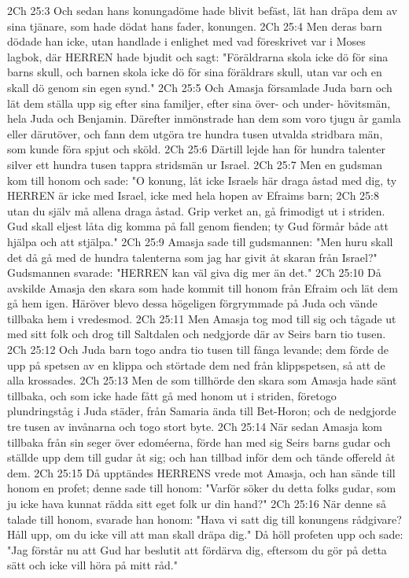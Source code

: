 2Ch 25:3  Och sedan hans konungadöme hade blivit befäst, lät han dräpa dem av sina tjänare, som hade dödat hans fader, konungen.
2Ch 25:4  Men deras barn dödade han icke, utan handlade i enlighet med vad föreskrivet var i Moses lagbok, där HERREN hade bjudit och sagt: "Föräldrarna skola icke dö för sina barns skull, och barnen skola icke dö för sina föräldrars skull, utan var och en skall dö genom sin egen synd."
2Ch 25:5  Och Amasja församlade Juda barn och lät dem ställa upp sig efter sina familjer, efter sina över- och under- hövitsmän, hela Juda och Benjamin. Därefter inmönstrade han dem som voro tjugu år gamla eller därutöver, och fann dem utgöra tre hundra tusen utvalda stridbara män, som kunde föra spjut och sköld.
2Ch 25:6  Därtill lejde han för hundra talenter silver ett hundra tusen tappra stridsmän ur Israel.
2Ch 25:7  Men en gudsman kom till honom och sade: "O konung, låt icke Israels här draga åstad med dig, ty HERREN är icke med Israel, icke med hela hopen av Efraims barn;
2Ch 25:8  utan du själv må allena draga åstad. Grip verket an, gå frimodigt ut i striden. Gud skall eljest låta dig komma på fall genom fienden; ty Gud förmår både att hjälpa och att stjälpa."
2Ch 25:9  Amasja sade till gudsmannen: "Men huru skall det då gå med de hundra talenterna som jag har givit åt skaran från Israel?" Gudsmannen svarade: "HERREN kan väl giva dig mer än det."
2Ch 25:10  Då avskilde Amasja den skara som hade kommit till honom från Efraim och lät dem gå hem igen. Häröver blevo dessa högeligen förgrymmade på Juda och vände tillbaka hem i vredesmod.
2Ch 25:11  Men Amasja tog mod till sig och tågade ut med sitt folk och drog till Saltdalen och nedgjorde där av Seirs barn tio tusen.
2Ch 25:12  Och Juda barn togo andra tio tusen till fånga levande; dem förde de upp på spetsen av en klippa och störtade dem ned från klippspetsen, så att de alla krossades.
2Ch 25:13  Men de som tillhörde den skara som Amasja hade sänt tillbaka, och som icke hade fått gå med honom ut i striden, företogo plundringståg i Juda städer, från Samaria ända till Bet-Horon; och de nedgjorde tre tusen av invånarna och togo stort byte.
2Ch 25:14  När sedan Amasja kom tillbaka från sin seger över edoméerna, förde han med sig Seirs barns gudar och ställde upp dem till gudar åt sig; och han tillbad inför dem och tände offereld åt dem.
2Ch 25:15  Då upptändes HERRENS vrede mot Amasja, och han sände till honom en profet; denne sade till honom: "Varför söker du detta folks gudar, som ju icke hava kunnat rädda sitt eget folk ur din hand?"
2Ch 25:16  När denne så talade till honom, svarade han honom: "Hava vi satt dig till konungens rådgivare? Håll upp, om du icke vill att man skall dräpa dig." Då höll profeten upp och sade: "Jag förstår nu att Gud har beslutit att fördärva dig, eftersom du gör på detta sätt och icke vill höra på mitt råd."
